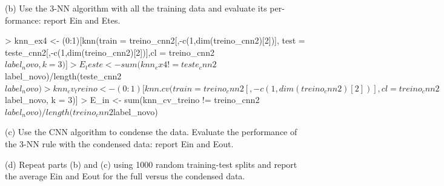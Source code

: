 \documentclass{article}
\begin{document}
(b) Use the 3-NN algorithm with all the training data and evaluate its per- formance: report Ein and Etes.

\begin{Schunk}
\begin{Sinput}
> knn_ex4 <- (0:1)[knn(train = treino_cnn2[,-c(1,dim(treino_cnn2)[2])], test = teste_cnn2[,-c(1,dim(treino_cnn2)[2])],cl = treino_cnn2$label_novo, k = 3)]
> E_teste <- sum(knn_ex4 != teste_cnn2$label_novo)/length(teste_cnn2$label_novo)
> knn_cv_treino <- (0:1)[knn.cv(train = treino_cnn2[,-c(1,dim(treino_cnn2)[2])],cl = treino_cnn2$label_novo, k = 3)]
> E_in <- sum(knn_cv_treino != treino_cnn2$label_novo)/length(treino_cnn2$label_novo)
\end{Sinput}
\end{Schunk}

(c) Use the CNN algorithm to condense the data. Evaluate the performance of the 3-NN rule with the condensed data: report Ein and Eout.
\begin{Schunk}
\end{Schunk}

(d) Repeat parts (b) and (c) using 1000 random training-test splits and report the average Ein and Eout for the full versus the condensed data.
\end{document}
